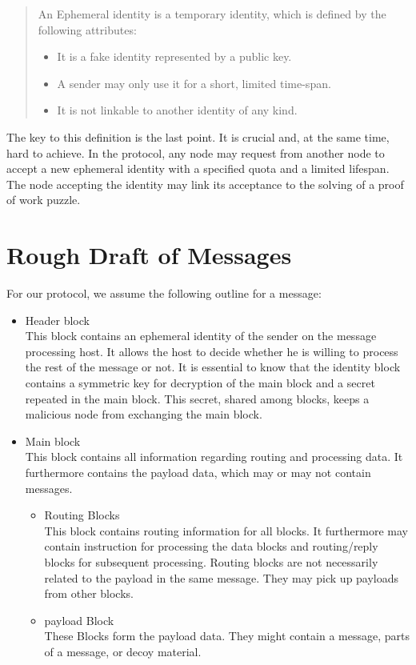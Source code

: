 \begin{quote}
	An Ephemeral identity is a temporary identity, which is defined by the following attributes:
	\begin{itemize}
		\item It is a fake identity represented by a public key.
		\item A sender may only use it for a short, limited time-span.
		\item It is not linkable to another identity of any kind.
	\end{itemize}
\end{quote}
The key to this definition is the last point. It is crucial and, at the same time, hard to achieve. In the protocol, any node may request from another node to accept a new ephemeral identity with a specified quota and a limited lifespan. The node accepting the identity may link its acceptance to the solving of a proof of work puzzle.

\section{Rough Draft of Messages}
For our protocol, we assume the following outline for a message:
\begin{itemize}
	\item Header block\\ 
	This block contains an ephemeral identity of the sender on the message processing host. It allows the host to decide whether he is willing to process the rest of the message or not. It is essential to know that the identity block contains a symmetric key for decryption of the main block and a secret repeated in the main block. This secret, shared among blocks, keeps a malicious node from exchanging the main block.
	\item Main block\\
	This block contains all information regarding routing and processing data. It furthermore contains the payload data, which may or may not contain messages.
	\begin{itemize}
		\item Routing Blocks\\
		This block contains routing information for all blocks. It furthermore may contain instruction for processing the data blocks and routing/reply blocks for subsequent processing. Routing blocks are not necessarily related to the payload in the same message. They may pick up payloads from other blocks.
		\item payload Block\\
		These Blocks form the payload data. They might contain a message, parts of a message, or decoy material.
	\end{itemize}      
\end{itemize}

